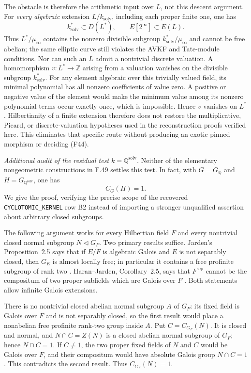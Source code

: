 The obstacle is therefore the arithmetic input over $L$, not this
descent argument. For \emph{every algebraic} extension
$L/k_{\mathrm{solv}}$, including each proper finite one, one has
\[
 k_{\mathrm{solv}}^*\subset D(L^*),\qquad
 E[2^\infty]\subset E(L).
\]
Thus $L^*/\mu_\infty$ contains the nonzero divisible subgroup
$k_{\mathrm{solv}}^*/\mu_\infty$ and cannot be free abelian;
the same elliptic curve still violates the AVKF and Tate-module
conditions. Nor can such an $L$ admit a nontrivial discrete
valuation. A homomorphism $v:L^*\to\mathbb Z$ arising from a
valuation vanishes on the divisible subgroup $k_{\mathrm{solv}}^*$.
For any element algebraic over this trivially valued field, its
minimal polynomial has all nonzero coefficients of value zero.
A positive or negative value of the element would make the
minimum value among its nonzero polynomial terms occur exactly
once, which is impossible. Hence $v$ vanishes on $L^*$.
Hilbertianity of a finite extension therefore does not restore
the multiplicative, Picard, or discrete-valuation hypotheses used
in the reconstruction proofs verified here. This eliminates that
specific route without producing an exotic pinned morphism or
deciding (F44).


\medskip
\noindent\emph{Additional audit of the residual test
$k=\mathbb Q^{\mathrm{solv}}$.}
Neither of the elementary nongeometric constructions in F.49 settles
this test. In fact, with $G=G_{\mathbb Q}$ and
$H=G_{\mathbb Q^{\mathrm{solv}}}$, one has
\[
                         C_G(H)=1.                         \tag{F44.C1}
\]
We give the proof, verifying the precise scope of the recovered
\texttt{CYCLOTOMIC\_KERNEL} row B2 instead of importing a stronger
unqualified assertion about arbitrary closed subgroups.

The following argument works for every Hilbertian field $F$ and
every nontrivial closed normal subgroup $N\triangleleft G_F$.
Two primary results suffice. Jarden's Proposition~2.5 says that if
$E/F$ is algebraic Galois and $E$ is not separably closed, then
$G_E$ is almost locally free; in particular it contains a free
profinite subgroup of rank two
\cite{F44Jarden2011}. Haran--Jarden, Corollary~2.5, says that
$F^{\mathrm{sep}}$ cannot be the compositum of two proper subfields
which are Galois over $F$ \cite{F44HaranJarden1991}. Both statements
allow infinite Galois extensions.

There is no nontrivial closed abelian normal subgroup $A$ of $G_F$:
its fixed field is Galois over $F$ and is not separably closed, so
the first result would place a nonabelian free profinite rank-two
group inside $A$. Put $C=C_{G_F}(N)$. It is closed and normal,
and $N\cap C=Z(N)$ is a closed abelian normal subgroup of $G_F$;
hence $N\cap C=1$. If $C\ne1$, the two proper fixed fields of
$N$ and $C$ would be Galois over $F$, and their compositum would
have absolute Galois group $N\cap C=1$. This contradicts the
second result. Thus $C_{G_F}(N)=1$.

